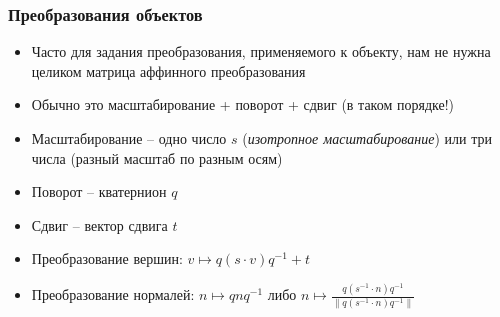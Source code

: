 \documentclass[10pt]{beamer}
\begin{document}
\begin{frame}[fragile]
\frametitle{Преобразования объектов}
\begin{itemize}
\item Часто для задания преобразования, применяемого к объекту, нам не нужна целиком матрица аффинного преобразования
\pause
\item Обычно это масштабирование + поворот + сдвиг (в таком порядке!)
\pause
\item Масштабирование -- одно число \begin{math}s\end{math} (\textit{изотропное масштабирование}) или три числа (разный масштаб по разным осям)
\pause
\item Поворот -- кватернион \begin{math}q\end{math}
\pause
\item Сдвиг -- вектор сдвига \begin{math}t\end{math}
\pause
\item Преобразование вершин: \begin{math}v \mapsto q(s\cdot v)q^{-1} + t\end{math}
\pause
\item Преобразование нормалей: \begin{math}n \mapsto qnq^{-1}\end{math} либо \begin{math}n \mapsto \frac{q(s^{-1}\cdot n)q^{-1}}{\|q(s^{-1}\cdot n)q^{-1}\|}\end{math}
\end{itemize}
\end{frame}
\end{document}
